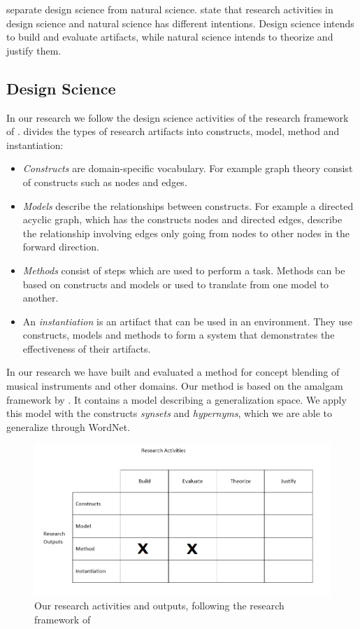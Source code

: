 \citet{simon1996sciences} separate design science from natural science.
\citet{march1995design} state that research activities in design science and natural science has different intentions. Design science intends to build and evaluate artifacts, while natural science intends to theorize and justify them.

\subsection{Design Science}

In our research we follow the design science activities of the research framework of \citet{march1995design}.
\citet{march1995design} divides the types of research artifacts into constructs, model, method and instantiation:
\begin{itemize}
\item \emph{Constructs} are domain-specific vocabulary. For example graph theory consist of constructs such as nodes and edges.
\item \emph{Models} describe the relationships between constructs. For example a directed acyclic graph, which has the constructs nodes and directed edges, describe the relationship involving edges only going from nodes to other nodes in the forward direction.
\item \emph{Methods} consist of steps which are used to perform a task. Methods can be based on constructs and models or used to translate from one model to another.
\item An \emph{instantiation} is an artifact that can be used in an environment. They use constructs, models and methods to form a system that demonstrates the effectiveness of their artifacts.
\end{itemize}

In our research we have built and evaluated a method for concept blending of musical instruments and other domains. Our method is based on the amalgam framework by \citet{ontanon2010amalgams}. It contains a model describing a generalization space. We apply this model with the constructs \emph{synsets} and \emph{hypernyms}, which we are able to generalize through WordNet. %

\begin{figure}
\centering
\includegraphics[width=1\linewidth]{"Figures/design science figur"}
\caption{Our research activities and outputs, following the research framework of \citet{march1995designfigure}}
\label{fig:design-science-figur}
\end{figure}


